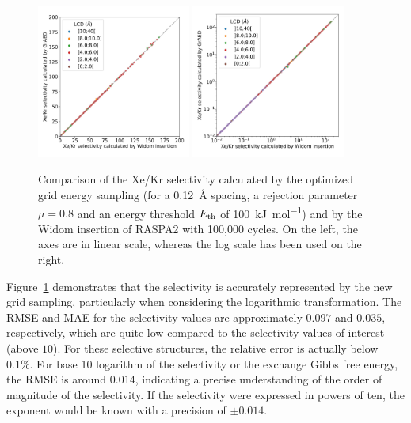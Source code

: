 \documentclass[main]{subfiles}
\begin{document}
\begin{figure}[ht]
  \centering
    \includegraphics[width=0.45\textwidth]{figures/3-fastsim/s_0_widom_vs_s_0_grid_overview.jpg}
    \hfill
    \includegraphics[width=0.45\textwidth]{figures/3-fastsim/s_0_widom_vs_s_0_grid_overview_log.jpg}
    \caption{Comparison of the Xe/Kr selectivity calculated by the optimized grid energy sampling (for a \SI{0.12}{\angstrom} spacing, a rejection parameter $\mu=0.8$ and an energy threshold $E_{\text{th}}$ of \SI{100}{\kilo\joule\per\mole}) and by the Widom insertion of RASPA2 with 100,000 cycles. On the left, the axes are in linear scale, whereas the log scale has been used on the right. }\label{fgr:grid_widom_selectivity}
\end{figure}

Figure~\ref{fgr:grid_widom_selectivity} demonstrates that the selectivity is accurately represented by the new grid sampling, particularly when considering the logarithmic transformation. The RMSE and MAE for the selectivity values are approximately $0.097$ and $0.035$, respectively, which are quite low compared to the selectivity values of interest (above $10$). For these selective structures, the relative error is actually below {0.1\%}. For base 10 logarithm of the selectivity or the exchange Gibbs free energy, the RMSE is around $0.014$, indicating a precise understanding of the order of magnitude of the selectivity. If the selectivity were expressed in powers of ten, the exponent would be known with a precision of $\pm 0.014$.
\end{document}
